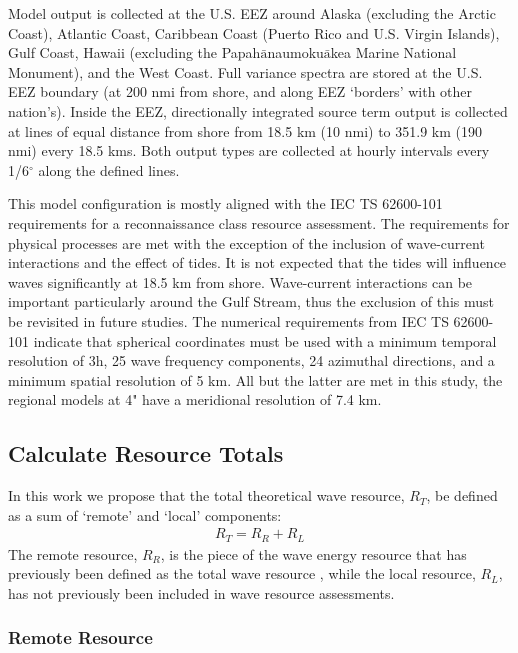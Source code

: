 Model output is collected at the U.S. EEZ around Alaska (excluding the Arctic Coast), Atlantic Coast, Caribbean Coast (Puerto Rico and U.S. Virgin Islands), Gulf Coast, Hawaii (excluding the Papah$\bar{\text{a}}$naumoku$\bar{\text{a}}$kea Marine National Monument), and the West Coast. Full variance spectra are stored at the U.S. EEZ boundary (at 200 nmi from shore, and along EEZ `borders' with other nation's). Inside the EEZ, directionally integrated source term output is collected at lines of equal distance from shore from 18.5 km (10 nmi) to 351.9 km (190 nmi) every 18.5 kms. Both output types are collected at hourly intervals every 1/6$^{\circ}$ along the defined lines.

This model configuration is mostly aligned with the IEC TS 62600-101 requirements for a reconnaissance class resource assessment. The requirements for physical processes are met with the exception of the inclusion of wave-current interactions and the effect of tides. It is not expected that the tides will influence waves significantly at 18.5 km from shore. Wave-current interactions can be important particularly around the Gulf Stream, thus the exclusion of this must be revisited in future studies. The numerical requirements from IEC TS 62600-101 indicate that spherical coordinates must be used with a minimum temporal resolution of 3h, 25 wave frequency components, 24 azimuthal directions, and a minimum spatial resolution of 5 km. All but the latter are met in this study, the regional models at 4" have a meridional resolution of 7.4 km.


\subsection{Calculate Resource Totals} \label{sec:method:calc}

In this work we propose that the total theoretical wave resource, $R_T$, be defined as a sum of `remote' and `local' components:
\begin{align}
  R_T = R_R + R_L
\end{align}
The remote resource, $R_R$, is the piece of the wave energy resource that has previously been defined as the total wave resource \citep{gunnQuantifyingGlobalWave2012,EPRIwaveresource2011}, while the local resource, $R_L$, has not previously been included in wave resource assessments.

\subsubsection{Remote Resource} \label{sec:method:calc:remote}

